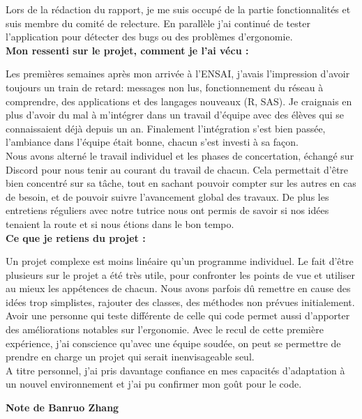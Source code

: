 \documentclass[11pt]{article}
\begin{document}
Lors de la rédaction du rapport, je me suis occupé de la partie fonctionnalités et suis membre du comité de relecture. En parallèle j'ai continué de tester l'application pour détecter des bugs ou des problèmes d'ergonomie.\\

\bigbreak
\textbf{ Mon ressenti sur le projet, comment je l’ai vécu :  }

Les premières semaines après mon arrivée à l'ENSAI, j'avais l'impression d'avoir toujours un train de retard: messages non lus, fonctionnement du réseau à comprendre, des applications et des langages nouveaux (R, SAS). Je craignais en plus d'avoir du mal à m'intégrer dans un travail d'équipe avec des élèves qui se connaissaient déjà depuis un an. Finalement l'intégration s'est bien passée, l'ambiance dans l'équipe était bonne, chacun s'est investi à sa façon.\\
Nous avons alterné le travail individuel et les phases de concertation, échangé sur Discord pour nous tenir au courant du travail de chacun. Cela permettait d'être bien concentré sur sa tâche, tout en sachant pouvoir compter sur les autres en cas de besoin, et de pouvoir suivre l'avancement global des travaux. De plus les entretiens réguliers avec notre tutrice nous ont permis de savoir si nos idées tenaient la route et si nous étions dans le bon tempo.\\

\bigbreak
\textbf{ Ce que je retiens du projet :   }

Un projet complexe est moins linéaire qu'un programme individuel. Le fait d'être plusieurs sur le projet a été très utile, pour confronter les points de vue et utiliser au mieux les appétences de chacun. Nous avons parfois dû remettre en cause des idées trop simplistes, rajouter des classes, des méthodes non prévues initialement. Avoir une personne qui teste différente de celle qui code permet aussi d'apporter des améliorations notables sur l'ergonomie. Avec le recul de cette première expérience, j'ai conscience qu'avec une équipe soudée, on peut se permettre de prendre en charge un projet qui serait inenvisageable seul.\\

A titre personnel, j'ai pris davantage confiance en mes capacités d'adaptation à un nouvel environnement et j'ai pu confirmer mon goût pour le code.

\newpage
\textbf{\Large Note de Banruo Zhang}
\end{document}
